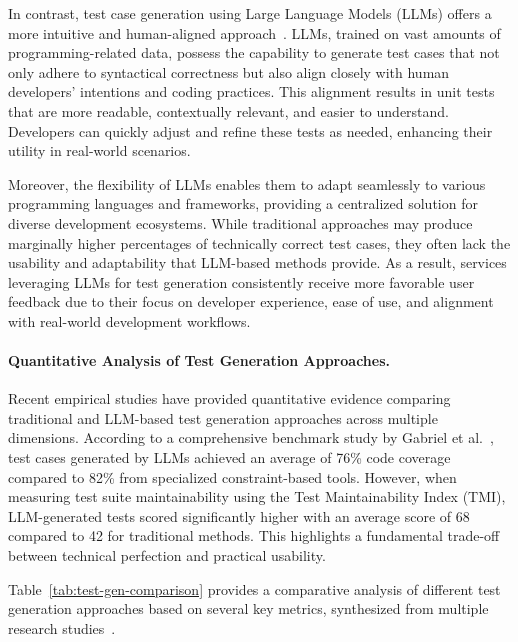 \hspace{0.5cm} In contrast, test case generation using Large Language Models (LLMs) offers a more intuitive and human-aligned approach~\cite{UnitTest}. LLMs, trained on vast amounts of programming-related data, possess the capability to generate test cases that not only adhere to syntactical correctness but also align closely with human developers' intentions and coding practices. This alignment results in unit tests that are more readable, contextually relevant, and easier to understand. Developers can quickly adjust and refine these tests as needed, enhancing their utility in real-world scenarios.

\hspace{0.5cm} Moreover, the flexibility of LLMs enables them to adapt seamlessly to various programming languages and frameworks, providing a centralized solution for diverse development ecosystems. While traditional approaches may produce marginally higher percentages of technically correct test cases, they often lack the usability and adaptability that LLM-based methods provide. As a result, services leveraging LLMs for test generation consistently receive more favorable user feedback due to their focus on developer experience, ease of use, and alignment with real-world development workflows.

\paragraph{Quantitative Analysis of Test Generation Approaches.} Recent empirical studies have provided quantitative evidence comparing traditional and LLM-based test generation approaches across multiple dimensions. According to a comprehensive benchmark study by Gabriel et al.~\cite{TestBenchmark}, test cases generated by LLMs achieved an average of 76\% code coverage compared to 82\% from specialized constraint-based tools. However, when measuring test suite maintainability using the Test Maintainability Index (TMI), LLM-generated tests scored significantly higher with an average score of 68 compared to 42 for traditional methods. This highlights a fundamental trade-off between technical perfection and practical usability.

\hspace{0.5cm} Table~\ref{tab:test-gen-comparison} provides a comparative analysis of different test generation approaches based on several key metrics, synthesized from multiple research studies~\cite{UnitTest, TestBenchmark, LLMTestComparison}.

